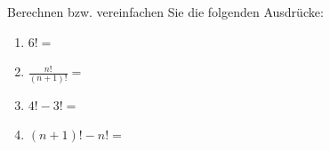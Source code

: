 \begin{ExerciseBlock}
Berechnen bzw. vereinfachen Sie die folgenden Ausdrücke:
\begin{enumerate}[label=\alph*)]
	\item $\displaystyle 6! = $
	\item $\displaystyle \frac{n!}{\left( n + 1 \right)!} = $
	\item $\displaystyle 4! - 3! = $
	\item $\displaystyle \left(n+1\right)! - n! = $
\end{enumerate}

\end{ExerciseBlock}
